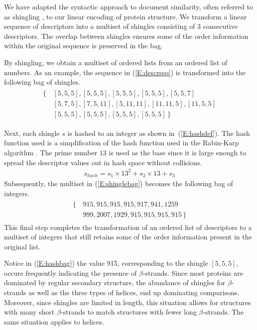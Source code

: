 \documentclass[10pt,letterpaper]{article}
\begin{document}
We have adapted the syntactic approach to document similarity, often referred to as shingling \cite{Broder1997a}, to our linear encoding of protein structure. 
We transform a linear sequence of descriptors into a multiset of shingles consisting of 3 consecutive descriptors.
The overlap between shingles ensures some of the order information within the original sequence is preserved in the bag. 

By shingling, we obtain a multiset of ordered lists from an ordered list of numbers. 
As an example, the sequence in (\ref{E:descrseq}) is transformed into the following bag of shingles. 
\begin{align}\label{E:shinglebag}
    \begin{split}
        \{\,&[5, 5, 5], [5, 5, 5], [5, 5, 5], [5, 5, 5], [5, 5, 7] \\
            & [5, 7, 5], [7, 5, 11], [5, 11, 11], [11, 11, 5], [11, 5, 5] \\
            & [5, 5, 5], [5, 5, 5], [5, 5, 5], [5, 5, 5] \,\}
    \end{split}
\end{align}

Next, each shingle $s$ is hashed to an integer as shown in~(\ref{E:hashdef}). 
The hash function used is a simplification of the hash function used in the Rabin-Karp algorithm \cite{Karp1987}.
The prime number $13$ is used as the base since it is large enough to spread the descriptor values out in hash space without collisions. 
\begin{gather}\label{E:hashdef}
    s_{hash} = s_1 \times 13^2 + s_2 \times 13 + s_3
\end{gather}
Subsequently, the multiset in (\ref{E:shinglebag}) becomes the following bag of integers.
\begin{align}\label{E:hashbag}
    \begin{split}
    \{\,&915, 915, 915, 915, 917, 941, 1259 \\
        &999, 2007, 1929, 915, 915, 915, 915 \,\}
    \end{split}
\end{align}
This final step completes the transformation of an ordered list of descriptors to a multiset of integers that still retains some of the order information present in the original list. 

Notice in (\ref{E:hashbag}) the value 915, corresponding to the shingle $[ 5, 5, 5 ]$, occurs frequently indicating the presence of $\beta$-strands. 
Since most proteins are dominated by regular secondary structure, the abundance of shingles for $\beta$-strands as well as the three types of helices, end up dominating comparisons. 
Moreover, since shingles are limited in length, this situation allows for structures with many short $\beta$-strands to match structures with fewer long $\beta$-strands.
The same situation applies to helices. 
\end{document}

